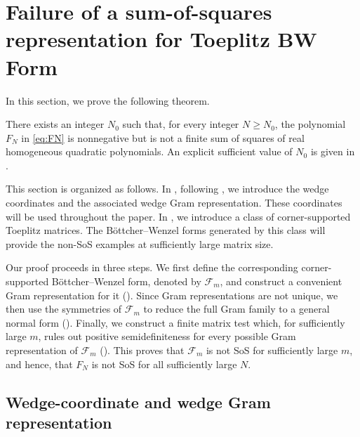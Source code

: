 \section{Failure of a sum-of-squares representation for Toeplitz BW Form}\label{sec:non-sos}

In this section, we prove the following theorem.
\begin{tcolorbox}[colback=white,colframe=black!60,boxrule=0.5pt,
 arc=0pt,left=7pt,right=7pt,top=3pt,bottom=3pt]
\begin{theorem}\label{thm:negative}
There exists an integer $N_0$ such that, for every integer $N\ge N_0$,
the polynomial $F_N$ in \eqref{eq:FN} is nonnegative but is not a finite
sum of squares of real homogeneous quadratic polynomials.
An explicit sufficient value of $N_0$ is given in
.
\end{theorem}
\end{tcolorbox}

This section is organized as follows.  In ,
following \cite[Section~2]{laszlo2012}, we introduce the wedge coordinates
and the associated wedge Gram representation.  These coordinates will be
used throughout the paper.  In , we introduce a class
of corner-supported Toeplitz matrices.  The B\"ottcher--Wenzel forms
generated by this class will provide the non-SoS examples at sufficiently
large matrix size.

Our proof proceeds in three steps.  We first define the corresponding
corner-supported B\"ottcher--Wenzel form, denoted by $\mathcal F_m$, and
construct a convenient Gram representation for it ().  Since Gram representations are not unique, we
then use the symmetries of $\mathcal F_m$ to reduce the full Gram family
to a general normal form ().  Finally, we construct a finite matrix test which, for
sufficiently large $m$, rules out positive semidefiniteness for every
possible Gram representation of $\mathcal F_m$ ().  This proves that
$\mathcal F_m$ is not SoS for sufficiently large $m$, and hence, that $F_N$ is not SoS for all sufficiently large $N$.

\subsection{Wedge-coordinate and wedge Gram representation}\label{app:wedge-gram}\label{subsec:wedge-coordinates}

